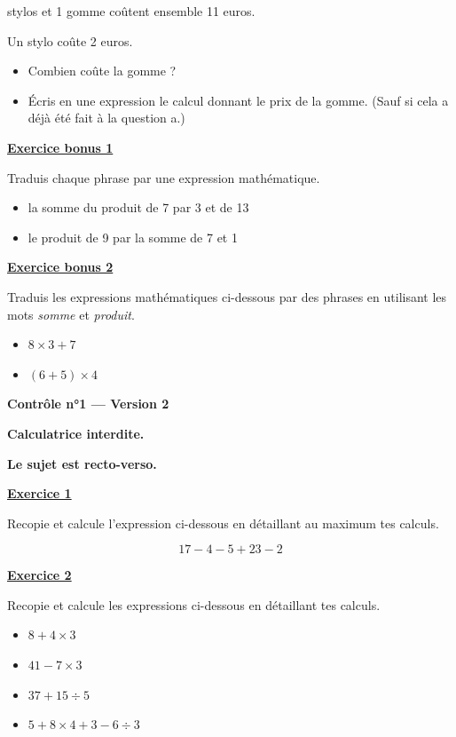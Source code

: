 \documentclass[13pt]{extarticle}
\newcommand{\exo}[1]{%
  \vspace{0.8em}%
  \noindent\large\underline{\textbf{Exercice #1}}%
  \vspace{0.2em}\par%
}
\newcommand{\exobonus}[1]{%
  \vspace{0.8em}%
  \noindent\large\underline{\textbf{Exercice bonus #1}}%
  \vspace{0.2em}\par%
}
\newcommand{\entetecontrole}[1]{%
\begin{center}
\textbf{\huge{Contrôle n°1 --- Version #1}}
\end{center}

\begin{center}
\textbf{Calculatrice interdite.}\par
\textbf{Le sujet est recto-verso.}

\end{center}
}
\begin{document}
 stylos et 1 gomme coûtent ensemble 11 euros.

\noindent Un stylo coûte 2 euros.

\begin{itemize}
  \item[a)] Combien coûte la gomme ?
  \item[b)] Écris en une expression le calcul donnant le prix de la gomme. (Sauf si cela a déjà été fait à la question a.)
\end{itemize}

\exobonus{1}

\noindent Traduis chaque phrase par une expression mathématique.

\begin{itemize}
  \item[a)] la somme du produit de 7 par 3 et de 13
  \item[b)] le produit de 9 par la somme de 7 et 1
\end{itemize}

\exobonus{2}

\noindent Traduis les expressions mathématiques ci-dessous par des phrases en utilisant les mots \emph{somme} et \emph{produit}.

\begin{itemize}
  \item[a)] $8 \times 3 + 7$
  \item[b)] $(6 + 5) \times 4$
\end{itemize}

\newpage

\entetecontrole{2}
\exo{1}

\noindent Recopie et calcule l'expression ci-dessous en détaillant au maximum tes calculs.

\[
17 - 4 - 5 + 23 - 2
\]

\exo{2}

\noindent Recopie et calcule les expressions ci-dessous en détaillant tes calculs.

\begin{itemize}
  \item[a)] $8 + 4 \times 3$
  \item[b)] $41 - 7 \times 3$
  \item[c)] $37 + 15 \div 5$
  \item[d)] $5 + 8 \times 4 + 3 - 6 \div 3$
\end{itemize}
\end{document}
